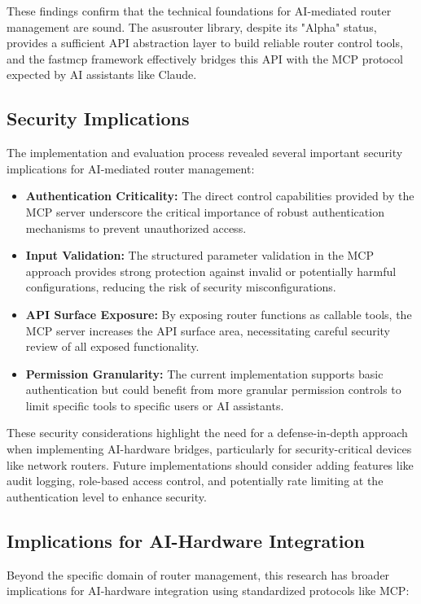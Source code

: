 These findings confirm that the technical foundations for AI-mediated router management are sound. The asusrouter library, despite its "Alpha" status, provides a sufficient API abstraction layer to build reliable router control tools, and the fastmcp framework effectively bridges this API with the MCP protocol expected by AI assistants like Claude.


\subsection{Security Implications}
The implementation and evaluation process revealed several important security implications for AI-mediated router management:

\begin{itemize}
\item \textbf{Authentication Criticality:} The direct control capabilities provided by the MCP server underscore the critical importance of robust authentication mechanisms to prevent unauthorized access.
\item \textbf{Input Validation:} The structured parameter validation in the MCP approach provides strong protection against invalid or potentially harmful configurations, reducing the risk of security misconfigurations.
\item \textbf{API Surface Exposure:} By exposing router functions as callable tools, the MCP server increases the API surface area, necessitating careful security review of all exposed functionality.
\item \textbf{Permission Granularity:} The current implementation supports basic authentication but could benefit from more granular permission controls to limit specific tools to specific users or AI assistants.
\end{itemize}

These security considerations highlight the need for a defense-in-depth approach when implementing AI-hardware bridges, particularly for security-critical devices like network routers. Future implementations should consider adding features like audit logging, role-based access control, and potentially rate limiting at the authentication level to enhance security.

\subsection{Implications for AI-Hardware Integration}
Beyond the specific domain of router management, this research has broader implications for AI-hardware integration using standardized protocols like MCP:

